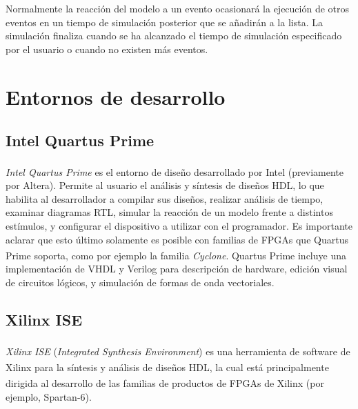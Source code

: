 Normalmente la reacción del modelo a un evento ocasionará la ejecución de otros eventos en un tiempo de simulación posterior que se añadirán a la lista. La simulación finaliza cuando se ha alcanzado el tiempo de simulación especificado por el usuario o cuando no existen más eventos.

\section{Entornos de desarrollo} 
\label{desarrollo-fpga}

\subsection{Intel Quartus Prime}

\emph{Intel Quartus Prime}\textsuperscript\textregistered\hspace{0.05pt} es el entorno de diseño desarrollado por Intel\textsuperscript\textregistered\hspace{0.05pt} (previamente por Altera). Permite al usuario el análisis y síntesis de diseños HDL, lo que habilita al desarrollador a compilar sus diseños, realizar análisis de tiempo, examinar diagramas RTL, simular la reacción de un modelo frente a distintos estímulos, y configurar el dispositivo a utilizar con el programador. Es importante aclarar que esto último solamente es posible con familias de FPGAs que Quartus Prime\textsuperscript\textregistered\hspace{0.05pt} soporta, como por ejemplo la familia \emph{Cyclone}.
Quartus Prime\textsuperscript\textregistered\hspace{0.05pt} incluye una implementación de VHDL y Verilog para descripción de hardware, edición visual de circuitos lógicos, y simulación de formas de onda vectoriales.

\subsection{Xilinx ISE}

\emph{Xilinx ISE}\textsuperscript\textregistered\hspace{0.05pt} (\emph{Integrated Synthesis Environment}) es una herramienta de software de Xilinx\textsuperscript\textregistered\hspace{0.05pt} para la síntesis y análisis de diseños HDL, la cual está principalmente dirigida al desarrollo de las familias de productos de FPGAs de Xilinx\textsuperscript\textregistered\hspace{0.05pt} (por ejemplo, Spartan-6).

